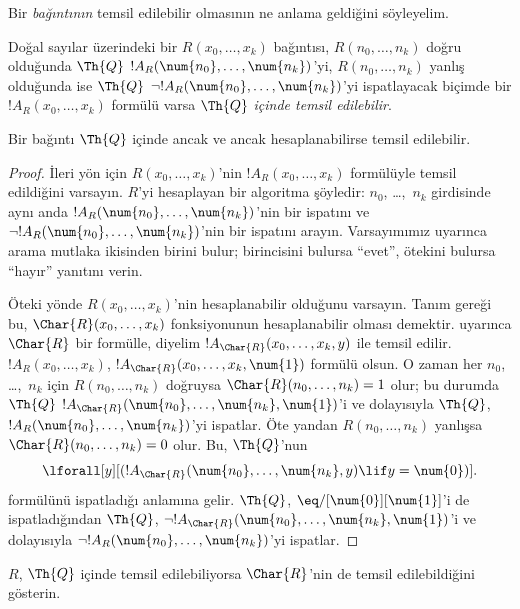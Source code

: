



Bir \emph{bağıntının} temsil edilebilir olmasının ne anlama geldiğini
söyleyelim.

\begin{defn}
 Doğal sayılar üzerindeki bir
$R(x_0,\dots,x_k)$ bağıntısı, $R(n_0,\dots,n_k)$ doğru olduğunda $\Th{Q}$
$!A_R(\num{n_0},\dots,\num{n_k})$'yi, $R(n_0,\dots,n_k)$ yanlış olduğunda ise $\Th{Q}$
$\lnot !A_R(\num{n_0},\dots,\num{n_k})$'yi ispatlayacak biçimde bir
$!A_R(x_0,\dots,x_k)$ formülü varsa {\em $\Th{Q}$ içinde temsil
edilebilir}.
\end{defn}

\begin{thm}
 Bir bağıntı $\Th{Q}$ içinde ancak ve ancak
hesaplanabilirse temsil edilebilir.
\end{thm}

\begin{proof}
İleri yön için $R(x_0,\dots,x_k)$'nin $!A_R(x_0,\dots,x_k)$ formülüyle
temsil edildiğini varsayın. $R$'yi hesaplayan bir algoritma şöyledir:
$n_0$, \dots,~$n_k$ girdisinde aynı anda
$!A_R(\num{n_0},\dots,\num{n_k})$'nin bir ispatını ve
$\lnot !A_R(\num{n_0},\dots,\num{n_k})$'nin bir ispatını arayın.
Varsayımımız uyarınca arama mutlaka ikisinden birini bulur; birincisini
bulursa ``evet'', ötekini bulursa ``hayır'' yanıtını verin.

Öteki yönde $R(x_0,\dots,x_k)$'nin hesaplanabilir olduğunu varsayın. Tanım
gereği bu, $\Char{R}(x_0,\dots,x_k)$ fonksiyonunun hesaplanabilir olması
demektir.  uyarınca $\Char{R}$ bir
formülle, diyelim $!A_{\Char{R}}(x_0,\dots,x_k,y)$ ile temsil edilir.
$!A_R(x_0,\dots,x_k)$, $!A_{\Char{R}}(x_0,\dots,x_k,\num{1})$ formülü
olsun. O zaman her $n_0$, \dots,~$n_k$ için $R(n_0,\dots,n_k)$ doğruysa
$\Char{R}(n_0,\dots,n_k)=1$ olur; bu durumda $\Th{Q}$
$!A_{\Char{R}}(\num{n_0},\dots,\num{n_k},\num{1})$'i ve dolayısıyla
$\Th{Q}$, $!A_R(\num{n_0},\dots,\num{n_k})$'yi ispatlar. Öte yandan
$R(n_0,\dots,n_k)$ yanlışsa $\Char{R}(n_0,\dots,n_k)=0$ olur. Bu,
$\Th{Q}$'nun
\[
\lforall[y][(!A_{\Char{R}}(\num{n_0}, \dots, \num{n_k}, y) \lif y =
  \num{0})].
\]
formülünü ispatladığı anlamına gelir. $\Th{Q}$,
$\eq/[\num{0}][\num{1}]$'i de ispatladığından $\Th{Q}$,
$\lnot !A_{\Char{R}}(\num{n_0},\dots,\num{n_k},\num{1})$'i ve dolayısıyla
$\lnot !A_R(\num{n_0},\dots,\num{n_k})$'yi ispatlar.
\end{proof}

\begin{prob}
$R$, $\Th{Q}$ içinde temsil edilebiliyorsa $\Char{R}$'nin de temsil
edilebildiğini gösterin.
\end{prob}

